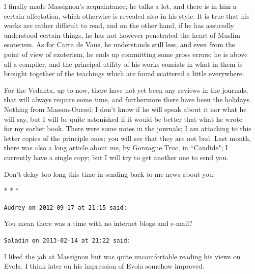 I finally made Massignon's acquaintance; he talks a lot, and there is in him a certain affectation, which otherwise is revealed also in his style. It is true that his works are rather difficult to read, and on the other hand, if he has assuredly understood certain things, he has not however penetrated the heart of Muslim esoterism. As for Carra de Vaus, he understands still less, and even from the point of view of exoterism, he ends up committing some gross errors; he is above all a compiler, and the principal utility of his works consists in what in them is brought together of the teachings which are found scattered a little everywhere.

For the Vedanta, up to now, there have not yet been any reviews in the journals; that will always require some time, and furthermore there have been the holidays. Nothing from Masson-Oursel; I don't know if he will speak about it nor what he will say, but I will be quite astonished if it would be better that what he wrote for my earlier book. There were some notes in the journals; I am attaching to this letter copies of the principle ones; you will see that they are not bad. Last month, there was also a long article about me, by Gonzague Truc, in ``Candide"; I currently have a single copy; but I will try to get another one to send you.

Don't delay too long this time in sending back to me news about you.




\begin{center}* * *\end{center}

\begin{footnotesize}\begin{sffamily}



\texttt{Audrey on 2012-09-17 at 21:15 said: }

You mean there was a time with no internet blogs and e-mail?


\hfill

\texttt{Saladin on 2013-02-14 at 21:22 said: }

I liked the jab at Massignon but was quite uncomfortable reading his views on Evola. I think later on his impression of Evola somehow improved.


\end{sffamily}\end{footnotesize}
